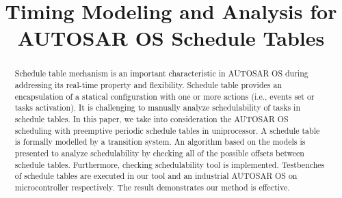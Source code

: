 \documentclass[sigconf]{acmart}
\begin{document}
\title{Timing Modeling and Analysis for AUTOSAR OS Schedule Tables}











\begin{abstract}
Schedule table mechanism is an important characteristic in AUTOSAR OS during addressing its real-time property and flexibility. Schedule table provides an encapsulation of a statical configuration with one or more actions (i.e., events set or tasks activation). It is challenging to manually analyze schedulability of tasks in schedule tables. In this paper, we take into consideration the AUTOSAR OS scheduling with preemptive periodic schedule tables in uniprocessor. A schedule table is formally modelled by a transition system.
An algorithm based on the models is presented to analyze schedulability by checking all of the possible offsets between schedule tables.
Furthermore, checking schedulability tool is implemented. Testbenches of schedule tables are executed in our tool and an industrial AUTOSAR OS on microcontroller respectively. The result demonstrates our method is effective.
\end{abstract}

%
%
\end{document}

